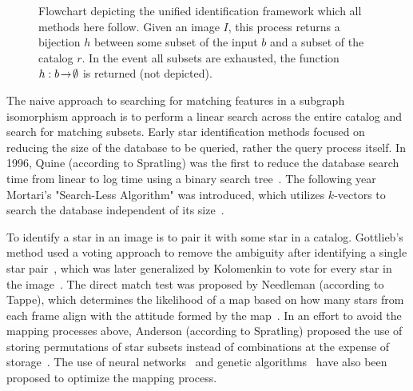 \documentclass[conference]{IEEEtran}
\begin{document}
\begin{figure}[ht]
{
        \caption{
        Flowchart depicting the unified identification framework which all methods here follow.
        Given an image $I$, this process returns a bijection $h$ between some subset of the input $b$ and a subset of the
        catalog $r$.
        In the event all subsets are exhausted, the function $h: b \! \rightarrow \! \emptyset$ is returned (not depicted).
        } \label{figure:unifiedIdentificationFlowchart}
        }
    \end{figure}

    The naive approach to searching for matching features in a subgraph isomorphism approach is to perform a
    linear search across the entire catalog and search for matching subsets.
    Early star identification methods focused on reducing the size of the database to be queried, rather the query process
    itself.
    In 1996, Quine (according to Spratling) was the first to reduce the database search time from linear to log time
    using a binary search tree~\cite{quine:fastAutonomousStarAcquistion}.
    The following year Mortari's "Search-Less Algorithm" was introduced, which utilizes $k$-vectors to search the database
    independent of its size~\cite{mortari:kVectorApproach}.

    To identify a star in an image is to pair it with some star in a catalog.
    Gottlieb's method used a voting approach to remove the ambiguity after identifying a single star
    pair~\cite{gottlieb:spacecraftAttitudeDetermination},
    which was later generalized by Kolomenkin to vote for every star in the image~\cite{kolomenkin:geometricVoting}.
    The direct match test was proposed by Needleman (according to Tappe), which determines the likelihood of a map based
    on how many stars from each frame align with the attitude formed by the map~\cite{needelman:stellarAttitudeAcquisition}.
    In an effort to avoid the mapping processes above, Anderson (according to Spratling) proposed the use of storing
    permutations of star subsets instead of combinations at the expense of storage~\cite{anderson:autonomousStarSensing}.
    The use of neural networks~\cite{lindsey:neuralNetworkMethods,alvelda:neuralNetworkStar} and genetic
    algorithms~\cite{paladugu:geneticAlgorithms} have also been proposed to optimize the mapping process.
\end{document}
